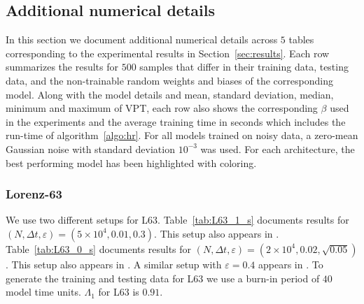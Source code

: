 \subsection{Additional numerical details}
\label{ssec:detail}

In this section we document additional numerical details across $5$ tables corresponding to the experimental results in Section~\ref{sec:results}. Each row summarizes the results for $500$ samples that differ in their training data, testing data, and the non-trainable random weights and biases of the corresponding model. Along with the model details and mean, standard deviation, median, minimum and maximum of VPT, each row also shows the corresponding $\beta$ used in the experiments and the average training time in seconds which includes the run-time of algorithm~\ref{algo:hr}. For all models trained on noisy data, a zero-mean Gaussian noise with standard deviation $10^{-3}$ was used. For each architecture, the best performing model has been highlighted with coloring.


\subsubsection{Lorenz-63}
\label{ssec:ap-L63} 

We use two different setups for L63. Table~\ref{tab:L63_1_s} documents results for $(N, \Delta t, \varepsilon) = (5\times10^4, 0.01, 0.3)$. This setup also appears in \cite{platt2022systematic}. Table~\ref{tab:L63_0_s} documents results for $(N, \Delta t, \varepsilon) = (2\times10^4, 0.02, \sqrt{0.05})$. This setup also appears in \cite{gottwald2021supervised, mandal2024choice}. A similar setup with $\varepsilon=0.4$ appears in \cite{akiyama2022computational}. To generate the training and testing data for L63 we use a burn-in period of $40$ model time units. $\Lambda_1$ for L63 is $0.91$.


